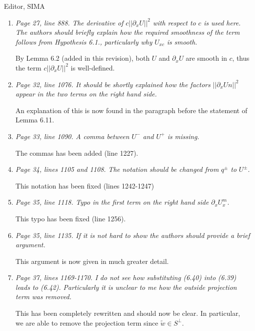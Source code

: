 \documentclass[11pt]{letter}
\begin{document}
\begin{letter}{Editor, SIMA}
\begin{enumerate}
\item \emph{Page 27, line 888. The derivative of $c||\partial_x U||^2$ with respect to $c$ is used here. The authors should briefly explain how the required smoothness of the term follows from Hypothesis 6.1., particularly why $U_{xc}$ is smooth.}
\vspace{4mm}

By Lemma 6.2 (added in this revision), both $U$ and $\partial_x U$ are smooth in $c$, thus the term $c||\partial_x U||^2$ is well-defined.

\item \emph{Page 32, line 1076. It should be shortly explained how the factors $||\partial_x Un||^2$ appear in the two terms on the right hand side.}
\vspace{4mm}

An explanation of this is now found in the paragraph before the statement of Lemma 6.11.

\item \emph{Page 33, line 1090. A comma between $U^-$ and $U^+$ is missing.}
\vspace{4mm}

The commas has been added (line 1227).

\item \emph{Page 34, lines 1105 and 1108. The notation should be changed from $q^\pm$ to $U^\pm$.}
\vspace{4mm}

This notation has been fixed (lines 1242-1247)

\item \emph{Page 35, line 1118. Typo in the first term on the right hand side $\partial_x U_x^m$.}
\vspace{4mm}

This typo has been fixed (line 1256).

\item \emph{Page 35, line 1135. If it is not hard to show the authors should provide a brief argument.}
\vspace{4mm}

This argument is now given in much greater detail.

\item \emph{Page 37, lines 1169-1170. I do not see how substituting (6.40) into (6.39) leads to (6.42). Particularly it is unclear to me how the outside projection term was removed.}
\vspace{4mm}

This has been completely rewritten and should now be clear. In particular, we are able to remove the projection term since $\tilde{w} \in S^\perp$.


\end{enumerate}
\end{letter}
\end{document}
